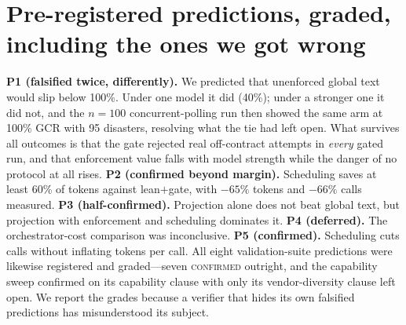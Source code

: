 \documentclass{article}
\begin{document}
\section{Pre-registered predictions, graded, including the ones we got wrong}\label{sec:honest}
\textbf{P1 (falsified twice, differently).} We predicted that unenforced global text would slip below 100\%. Under one model it did (40\%); under a stronger one it did not, and the $n{=}100$ concurrent-polling run then showed the same arm at 100\% GCR with 95 disasters, resolving what the tie had left open. What survives all outcomes is that the gate rejected real off-contract attempts in \emph{every} gated run, and that enforcement value falls with model strength while the danger of no protocol at all rises. \textbf{P2 (confirmed beyond margin).} Scheduling saves at least 60\% of tokens against lean$+$gate, with $-65\%$ tokens and $-66\%$ calls measured. \textbf{P3 (half-confirmed).} Projection alone does not beat global text, but projection with enforcement and scheduling dominates it. \textbf{P4 (deferred).} The orchestrator-cost comparison was inconclusive. \textbf{P5 (confirmed).} Scheduling cuts calls without inflating tokens per call. All eight validation-suite predictions were likewise registered and graded---seven \textsc{confirmed} outright, and the capability sweep confirmed on its capability clause with only its vendor-diversity clause left open. We report the grades because a verifier that hides its own falsified predictions has misunderstood its subject.
\end{document}

